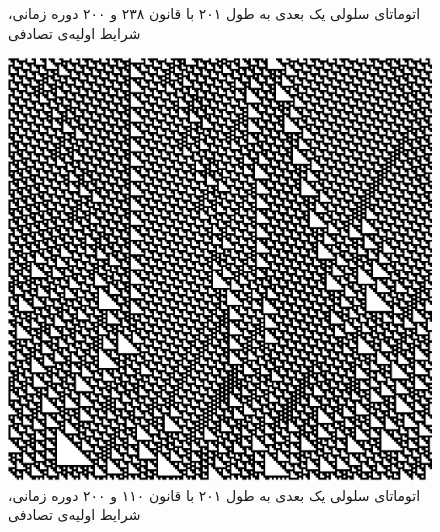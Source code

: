 \documentclass[11pt, a4paper]{article}
\begin{document}
\begin{figure}[!tbp]
\begin{minipage}[b]{0.3\textwidth}
    \caption{اتوماتای سلولی یک بعدی به طول ۲۰۱ با قانون ۲۳۸ و ۲۰۰ دوره زمانی، شرایط اولیه‌ی تصادفی}
    \label{fig:q3-238-rand}
  \end{minipage}
  \hfill
  \begin{minipage}[b]{0.3\textwidth}
    \includegraphics[width=\textwidth]{q3-110-rand}
    \caption{اتوماتای سلولی یک بعدی به طول ۲۰۱ با قانون ۱۱۰ و ۲۰۰ دوره زمانی، شرایط اولیه‌ی تصادفی}
    \label{fig:q3-110-rand}
  \end{minipage}
  \hfill
\end{figure}
\end{document}
